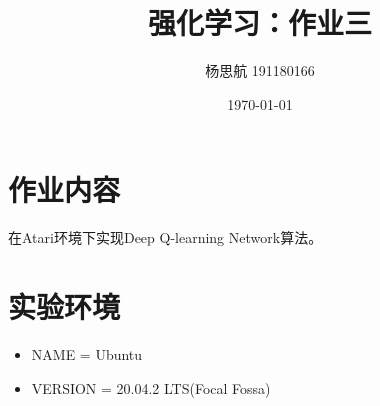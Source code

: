 \documentclass[a4paper,12pt]{article}
\begin{document}
\title{强化学习：作业三}

\author{杨思航 191180166}

\date{\today}

\maketitle

\section{作业内容}
在Atari环境下实现Deep Q-learning Network算法。

\section{实验环境}
\begin{itemize}
    \item NAME = Ubuntu
    \item VERSION = 20.04.2 LTS(Focal Fossa)
\end{itemize}
\end{document}
